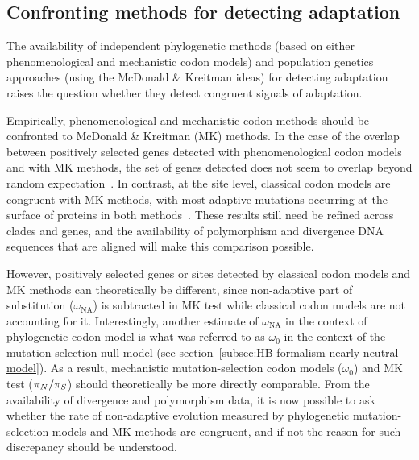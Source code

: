 \subsection{Confronting methods for detecting adaptation}
\label{subsec:confronting-methods-for-detecting-adaptation}

The availability of independent phylogenetic methods (based on either phenomenological and mechanistic codon models) and population genetics approaches (using the McDonald \& Kreitman ideas) for detecting adaptation raises the question whether they detect congruent signals of adaptation.

Empirically, phenomenological and mechanistic codon methods should be confronted to McDonald \& Kreitman (\acrshort{MK}) methods.
In the case of the overlap between positively selected genes detected with phenomenological codon models and with \acrshort{MK} methods, the set of genes detected does not seem to overlap beyond random expectation~\citep{He2020}.
In contrast, at the site level, classical codon models are congruent with \acrshort{MK} methods, with most adaptive mutations occurring at the surface of proteins in both methods~\citep{Moutinho2019}.
These results still need be refined across clades and genes, and the availability of polymorphism and divergence \acrshort{DNA} sequences that are aligned will make this comparison possible.

However, positively selected genes or sites detected by classical codon models and \acrshort{MK} methods can theoretically be different, since non-adaptive part of substitution ($\omega_{\text{NA}}$) is subtracted in \acrshort{MK} test while classical codon models are not accounting for it.
Interestingly, another estimate of $\omega_{\text{NA}}$ in the context of phylogenetic codon model is what was referred to as $\omega_0$ in the context of the mutation-selection null model (see section~\ref{subsec:HB-formalism-nearly-neutral-model}).
As a result, mechanistic mutation-selection codon models ($\omega_0$) and \acrshort{MK} test ($\pi_N / \pi_S$) should theoretically be more directly comparable.
From the availability of divergence and polymorphism data, it is now possible to ask whether the rate of non-adaptive evolution measured by phylogenetic mutation-selection models and \acrshort{MK} methods are congruent, and if not the reason for such discrepancy should be understood.


